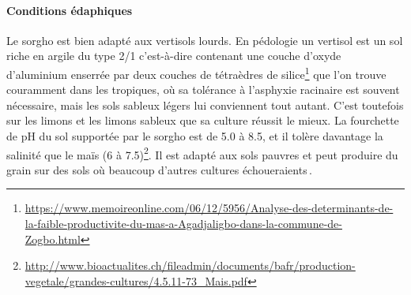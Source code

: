 \documentclass[a4paper,11pt]{article}
\begin{document}
\paragraph{Conditions édaphiques}
Le sorgho est bien adapté aux vertisols lourds. En pédologie un
vertisol est un sol riche en argile du type 2/1 c’est-à-dire contenant
une couche d’oxyde d’aluminium enserrée par deux couches de tétraèdres
de
silice\footnote{\url{https://www.memoireonline.com/06/12/5956/Analyse-des-determinants-de-la-faible-productivite-du-mas-a-Agadjaligbo-dans-la-commune-de-Zogbo.html}}
que l’on trouve couramment dans les tropiques, où sa tolérance à
l’asphyxie racinaire est souvent nécessaire, mais les sols sableux
légers lui conviennent tout autant. C’est toutefois sur les limons et
les limons sableux que sa culture réussit le mieux. La fourchette de
pH du sol supportée par le sorgho est de 5.0 à 8.5, et il tolère
davantage la salinité que le maïs (6 à
7.5)\footnote{\url{http://www.bioactualites.ch/fileadmin/documents/bafr/production-vegetale/grandes-cultures/4.5.11-73_Mais.pdf}}. Il
est adapté aux sols pauvres et peut produire du grain sur des sols où
beaucoup d’autres cultures échoueraients\,\cite{BARRO_KONDOMBO_2010}.
 
 
\end{document}
